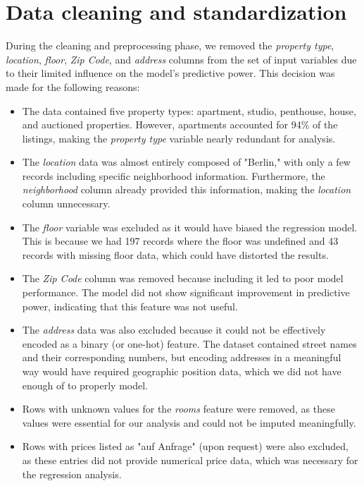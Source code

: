\documentclass[twocolumn]{article}
\begin{document}
\section{Data cleaning and standardization}
During the cleaning and preprocessing phase, we removed the \textit{property type}, \textit{location}, \textit{floor}, \textit{Zip Code}, and \textit{address} columns from the set of input variables due to their limited influence on the model's predictive power. This decision was made for the following reasons:
\begin{itemize}
    \item The data contained five property types: apartment, studio, penthouse, house, and auctioned properties. However, apartments accounted for 94\% of the listings, making the \textit{property type} variable nearly redundant for analysis.
    \item The \textit{location} data was almost entirely composed of "Berlin," with only a few records including specific neighborhood information. Furthermore, the \textit{neighborhood} column already provided this information, making the \textit{location} column unnecessary.
    \item The \textit{floor} variable was excluded as it would have biased the regression model. This is because we had 197 records where the floor was undefined and 43 records with missing floor data, which could have distorted the results.
    \item The \textit{Zip Code} column was removed because including it led to poor model performance. The model did not show significant improvement in predictive power, indicating that this feature was not useful.
    \item The \textit{address} data was also excluded because it could not be effectively encoded as a binary (or one-hot) feature. The dataset contained street names and their corresponding numbers, but encoding addresses in a meaningful way would have required geographic position data, which we did not have enough of to properly model.
    \item Rows with unknown values for the \textit{rooms} feature were removed, as these values were essential for our analysis and could not be imputed meaningfully.
    \item Rows with prices listed as "auf Anfrage" (upon request) were also excluded, as these entries did not provide numerical price data, which was necessary for the regression analysis.
\end{itemize}
\end{document}
